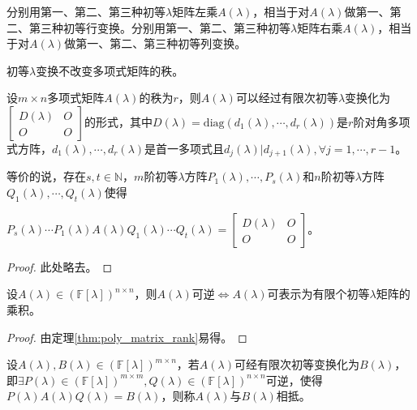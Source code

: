         分别用第一、第二、第三种初等$\lambda$矩阵左乘$A(\lambda)$，相当于对$A(\lambda)$做第一、第二、第三种初等行变换。分别用第一、第二、第三种初等$\lambda$矩阵右乘$A(\lambda)$，相当于对$A(\lambda)$做第一、第二、第三种初等列变换。

        初等$\lambda$变换不改变多项式矩阵的秩。

        \begin{theorem}
            \label{thm:poly_matrix_rank}
            设$m\times n$多项式矩阵$A(\lambda)$的秩为$r$，则$A(\lambda)$可以经过有限次初等$\lambda$变换化为$\begin{bmatrix}D(\lambda)&O\\O&O\end{bmatrix}$的形式，其中$D(\lambda)=\mathrm{diag}(d_1(\lambda),\cdots,d_r(\lambda))$是$r$阶对角多项式方阵，$d_1(\lambda),\cdots,d_r(\lambda)$是首一多项式且$d_j(\lambda)|d_{j+1}(\lambda),\forall j=1,\cdots,r-1$。

            等价的说，存在$s,t\in\mathbb{N}$，$m$阶初等$\lambda$方阵$P_1(\lambda),\cdots,P_s(\lambda)$和$n$阶初等$\lambda$方阵$Q_1(\lambda),\cdots,Q_t(\lambda)$使得

            $P_s(\lambda)\cdots P_1(\lambda)A(\lambda)Q_1(\lambda)\cdots Q_t(\lambda)=\begin{bmatrix}D(\lambda)&O\\O&O\end{bmatrix}$。
        \end{theorem}

        \begin{proof}
            此处略去。
        \end{proof}

        \begin{theorem}
            设$A(\lambda)\in(\mathbb{F}[\lambda])^{n\times n}$，则$A(\lambda)$可逆$\Leftrightarrow A(\lambda)$可表示为有限个初等$\lambda$矩阵的乘积。
        \end{theorem}

        \begin{proof}
            由定理\ref{thm:poly_matrix_rank}易得。
        \end{proof}

        \begin{definition}[多项式矩阵的相抵]
            设$A(\lambda), B(\lambda)\in(\mathbb{F}[\lambda])^{m\times n}$，若$A(\lambda)$可经有限次初等变换化为$B(\lambda)$，即$\exists P(\lambda)\in(\mathbb{F}[\lambda])^{m\times m}, Q(\lambda)\in(\mathbb{F}[\lambda])^{n\times n}$可逆，使得$P(\lambda)A(\lambda)Q(\lambda)=B(\lambda)$，则称$A(\lambda)$与$B(\lambda)$相抵。
        \end{definition}

